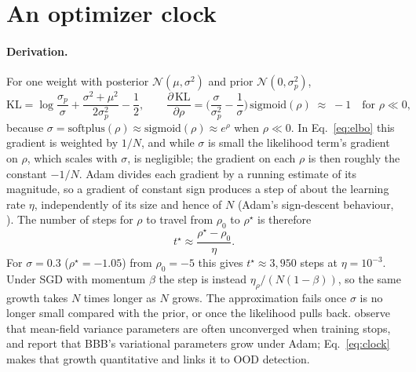 \documentclass[10pt]{article}
\begin{document}
\section{An optimizer clock}\label{sec:clock}
\paragraph{Derivation.} For one weight with posterior $\mathcal N(\mu,\sigma^2)$
and prior $\mathcal N(0,\sigma_p^2)$,
\begin{equation}
\mathrm{KL}=\log\frac{\sigma_p}{\sigma}+\frac{\sigma^2+\mu^2}{2\sigma_p^2}-\frac12,
\qquad
\frac{\partial\,\mathrm{KL}}{\partial\rho}
=\Big(\frac{\sigma}{\sigma_p^2}-\frac{1}{\sigma}\Big)\,\mathrm{sigmoid}(\rho)
\;\approx\;-1 \quad\text{for } \rho\ll 0,
\label{eq:klgrad}
\end{equation}
because $\sigma=\mathrm{softplus}(\rho)\approx\mathrm{sigmoid}(\rho)\approx e^{\rho}$
when $\rho\ll0$. In Eq.~\ref{eq:elbo} this gradient is weighted by $1/N$,
and while $\sigma$ is small the likelihood term's gradient on $\rho$, which
scales with $\sigma$, is negligible; the gradient on each $\rho$ is then
roughly the constant $-1/N$. Adam divides each gradient by a running estimate
of its magnitude, so a gradient of constant sign produces a step of about the
learning rate $\eta$, independently of its size and hence of $N$ (Adam's
sign-descent behaviour, \citealp{balles2018dissecting}). The number of steps
for $\rho$ to travel from $\rho_0$ to $\rho^\star$ is therefore
\begin{equation}
t^\star \approx \frac{\rho^\star-\rho_0}{\eta}.
\label{eq:clock}
\end{equation}
For $\sigma=0.3$ ($\rho^\star=-1.05$) from $\rho_0=-5$ this gives
$t^\star\approx 3{,}950$ steps at $\eta=10^{-3}$. Under SGD with momentum $\beta$
the step is instead $\eta_\rho/(N(1-\beta))$, so the same growth takes $N$
times longer as $N$ grows. The approximation fails once $\sigma$ is no longer
small compared with the prior, or once the likelihood pulls back.
\citet{unlu2020variational} observe that mean-field variance parameters are
often unconverged when training stops, and \citet{nishida2022adamb} report
that BBB's variational parameters grow under Adam; Eq.~\ref{eq:clock} makes
that growth quantitative and links it to OOD detection.
\end{document}
